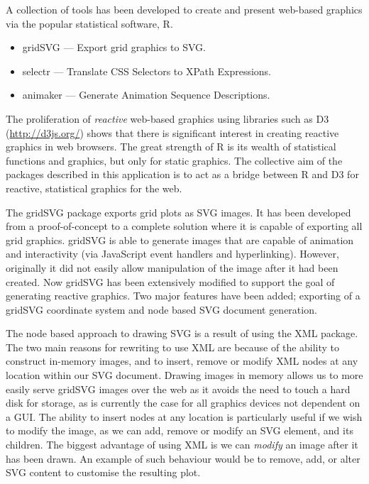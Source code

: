 \documentclass[11pt, a4paper]{article}
\title{\doctitle{}}
\author{\docauthor{} \\ \url{simon.potter@auckland.ac.nz}}
\date{\docdate{}}
\newcommand{\grid}{\textsf{grid}}
\newcommand{\R}{\textsf{R}}
\newcommand{\gridSVG}{\textsf{gridSVG}}
\newcommand{\JS}{\textsf{JavaScript}}
\newcommand{\pkg}[1]{\textsf{#1}}
\newcommand{\tsc}[1]{{\small \textsc{#1}}}
\begin{document}
\maketitle

A collection of tools has been developed to create and present
web-based graphics via the popular statistical software, \R{}.

\begin{itemize}
  \item \gridSVG{} --- Export \grid{} graphics to \tsc{SVG}.
  \item \pkg{selectr} --- Translate CSS Selectors to XPath Expressions.
  \item \pkg{animaker} --- Generate Animation Sequence Descriptions.
\end{itemize}

The proliferation of \emph{reactive} web-based graphics using
libraries such as D3 (\url{http://d3js.org/}) shows that there is
significant interest in creating reactive graphics in web
browsers. The great strength of R is its wealth of statistical
functions and graphics, but only for static graphics. The collective
aim of the packages described in this application is to act as a
bridge between R and D3 for reactive, statistical graphics for the
web.

The \gridSVG{} package exports \pkg{grid} plots as \tsc{SVG}
images. It has been developed from a proof-of-concept to a complete
solution where it is capable of exporting all \grid{}
graphics. \gridSVG{} is able to generate images that are capable of
animation and interactivity (via \JS{} event handlers and
hyperlinking). However, originally it did not easily allow
manipulation of the image after it had been created. Now \pkg{gridSVG}
has been extensively modified to support the goal of generating
reactive graphics. Two major features have been added; exporting of a
\gridSVG{} coordinate system and node based \tsc{SVG} document
generation.

The node based approach to drawing \tsc{SVG} is a result of using the
\pkg{XML} package. The two main reasons for rewriting to use \pkg{XML}
are because of the ability to construct in-memory images, and to
insert, remove or modify \tsc{XML} nodes at any location within our
\tsc{SVG} document. Drawing images in memory allows us to more easily
serve \gridSVG{} images over the web as it avoids the need to touch a
hard disk for storage, as is currently the case for all graphics
devices not dependent on a GUI. The ability to insert nodes at any
location is particularly useful if we wish to modify the image, as we
can add, remove or modify an \tsc{SVG} element, and its children. The
biggest advantage of using \pkg{XML} is we can \emph{modify} an image
after it has been drawn. An example of such behaviour would be to
remove, add, or alter \tsc{SVG} content to customise the resulting
plot.
\end{document}
